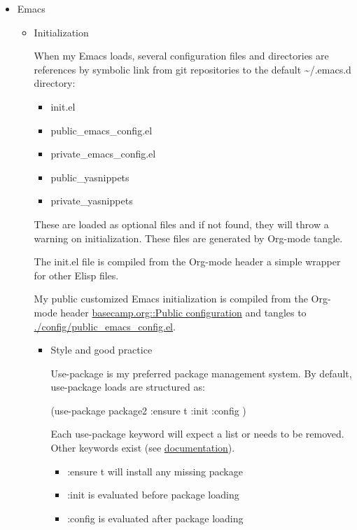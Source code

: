 \documentclass{article}
\begin{document}
\begin{itemize}
\begin{itemize}
\item Emacs
\label{sec:orgee88f42}
\begin{itemize}
\item Initialization
\label{sec:org8d4fe25}

When my Emacs loads, several configuration files and directories are references by symbolic link from git repositories to the default \textasciitilde{}/.emacs.d directory:

\begin{itemize}
\item init.el
\item public\_emacs\_config.el
\item private\_emacs\_config.el
\item public\_yasnippets
\item private\_yasnippets
\end{itemize}

These are loaded as optional files and if not found, they will throw a warning on initialization. These files are generated by Org-mode tangle.

The init.el file is compiled from the Org-mode header a simple wrapper for other Elisp files.

My public customized Emacs initialization is compiled from the Org-mode header \hyperref[sec:orgaa02ff8]{basecamp.org::Public configuration} and tangles to \href{config/public\_emacs\_config.el}{./config/public\_emacs\_config.el}.

\begin{itemize}
\item Style and good practice
\label{sec:org00a122a}

Use-package is my preferred package management system. By default, use-package loads are structured as:

(use-package package2
  :ensure t
  :init
  :config
)

Each use-package keyword will expect a list or needs to be removed. Other keywords exist (see \href{https://www.gnu.org/software/emacs/manual/html\_node/use-package/index.html\#SEC\_Contents}{documentation}).

\begin{itemize}
\item :ensure t will install any missing package
\item :init is evaluated before package loading
\item :config is evaluated after package loading
\end{itemize}
\end{itemize}


\end{itemize}
\end{itemize}
\end{itemize}
\end{document}
